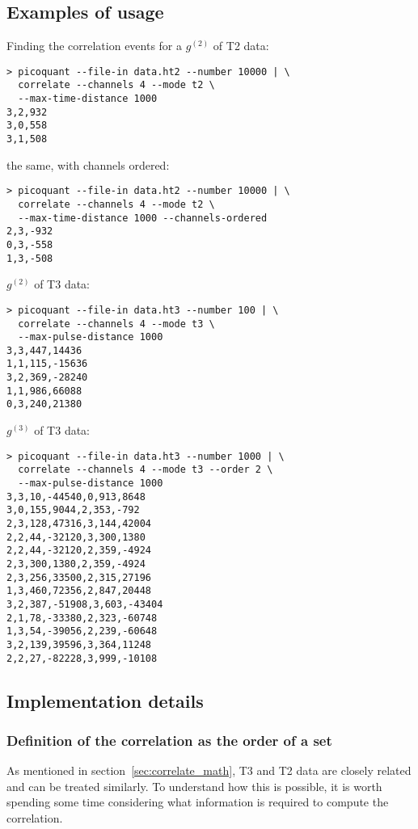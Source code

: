 \documentclass{article}
\newcommand{\gn}[1]{\ensuremath{g^{(#1)}}}
\begin{document}
\subsection{Examples of usage}
Finding the correlation events for a \gn{2} of T2 data:
\begin{verbatim}
> picoquant --file-in data.ht2 --number 10000 | \
  correlate --channels 4 --mode t2 \
  --max-time-distance 1000
3,2,932
3,0,558
3,1,508
\end{verbatim}
the same, with channels ordered:
\begin{verbatim}
> picoquant --file-in data.ht2 --number 10000 | \
  correlate --channels 4 --mode t2 \
  --max-time-distance 1000 --channels-ordered
2,3,-932
0,3,-558
1,3,-508
\end{verbatim}
\gn{2} of T3 data:
\begin{verbatim}
> picoquant --file-in data.ht3 --number 100 | \
  correlate --channels 4 --mode t3 \
  --max-pulse-distance 1000
3,3,447,14436
1,1,115,-15636
3,2,369,-28240
1,1,986,66088
0,3,240,21380
\end{verbatim}
\gn{3} of T3 data:
\begin{verbatim}
> picoquant --file-in data.ht3 --number 1000 | \
  correlate --channels 4 --mode t3 --order 2 \
  --max-pulse-distance 1000
3,3,10,-44540,0,913,8648
3,0,155,9044,2,353,-792
2,3,128,47316,3,144,42004
2,2,44,-32120,3,300,1380
2,2,44,-32120,2,359,-4924
2,3,300,1380,2,359,-4924
2,3,256,33500,2,315,27196
1,3,460,72356,2,847,20448
3,2,387,-51908,3,603,-43404
2,1,78,-33380,2,323,-60748
1,3,54,-39056,2,239,-60648
3,2,139,39596,3,364,11248
2,2,27,-82228,3,999,-10108
\end{verbatim}

\subsection{Implementation details}
\label{sec:correlation_implementation}
\subsubsection{Definition of the correlation as the order of a set}
As mentioned in section~\ref{sec:correlate_math}, T3 and T2 data are closely related and can be treated similarly. To understand how this is possible, it is worth spending some time considering what information is required to compute the correlation.
\end{document}
